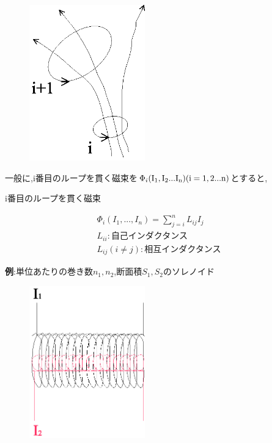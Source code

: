 \documentclass[../main]{subfiles}
\begin{document}
\begin{figure}[htbp]
 \begin{center}
  \includegraphics[width=50mm]{11.3.eps}
 \end{center}
 \caption{}
 \label{fig:one}
\end{figure}

一般に,i番目のループを貫く磁束を$\Phi_i {\rm (I_1,I_2...I_n) (i=1,2...n)}$とすると,

\begin{itembox}[c]{i番目のループを貫く磁束}

\begin{eqnarray*}
\Phi_i(I_1,...,I_n) = \sum_{j=i}^{n}L_{ij}I_j \\
L_{ii}:\mbox{自己インダクタンス} \\
L_{ij}(i \neq j) : \mbox{相互インダクタンス}
\end{eqnarray*}

\end{itembox}



\newpage

{\bf 例}:単位あたりの巻き数$n_1,n_2$,断面積$S_1,S_2$のソレノイド \\


\begin{figure}[htbp]
 \begin{center}
  \includegraphics[width=50mm]{11.4.eps}
 \end{center}
 \caption{}
 \label{fig:one}
\end{figure}
\end{document}

